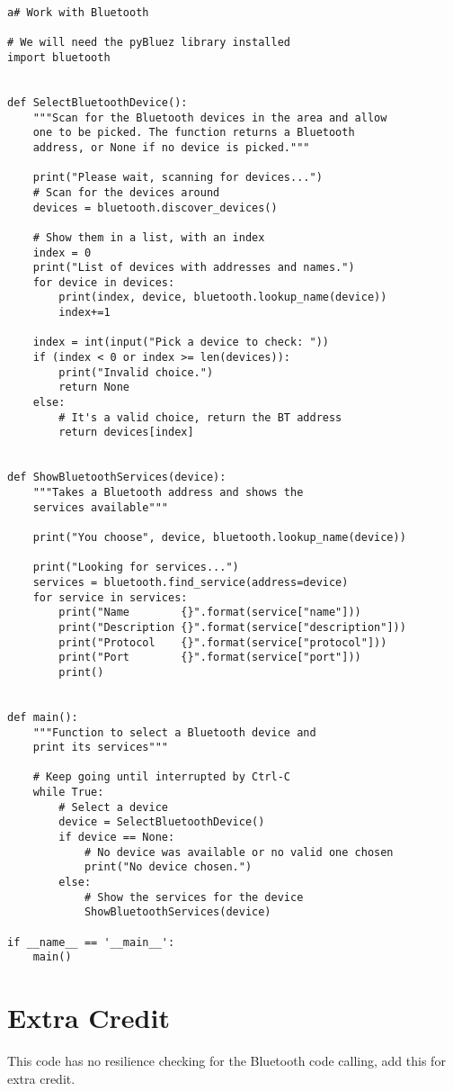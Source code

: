 \documentclass[12pt,oneside]{cttutorial}
\begin{document}
\begin{lstlisting}
a# Work with Bluetooth

# We will need the pyBluez library installed
import bluetooth


def SelectBluetoothDevice():
    """Scan for the Bluetooth devices in the area and allow
    one to be picked. The function returns a Bluetooth
    address, or None if no device is picked."""

    print("Please wait, scanning for devices...")
    # Scan for the devices around
    devices = bluetooth.discover_devices()

    # Show them in a list, with an index
    index = 0
    print("List of devices with addresses and names.")
    for device in devices:
        print(index, device, bluetooth.lookup_name(device))
        index+=1

    index = int(input("Pick a device to check: "))
    if (index < 0 or index >= len(devices)):
        print("Invalid choice.")
        return None
    else:
        # It's a valid choice, return the BT address
        return devices[index]


def ShowBluetoothServices(device):
    """Takes a Bluetooth address and shows the
    services available"""

    print("You choose", device, bluetooth.lookup_name(device))

    print("Looking for services...")
    services = bluetooth.find_service(address=device)
    for service in services:
        print("Name        {}".format(service["name"]))
        print("Description {}".format(service["description"]))
        print("Protocol    {}".format(service["protocol"]))
        print("Port        {}".format(service["port"]))
        print()


def main():
    """Function to select a Bluetooth device and
    print its services"""
    
    # Keep going until interrupted by Ctrl-C
    while True:
        # Select a device 
        device = SelectBluetoothDevice()
        if device == None:
            # No device was available or no valid one chosen
            print("No device chosen.")
        else:
            # Show the services for the device
            ShowBluetoothServices(device)
        
if __name__ == '__main__':
    main()

\end{lstlisting}

\section{Extra Credit}

This code has no resilience checking for the Bluetooth code calling, add this for extra credit.
\end{document}
